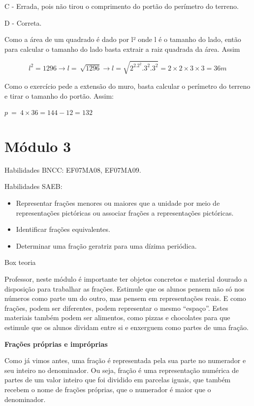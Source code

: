 C - Errada, pois não tirou o comprimento do portão do perímetro do
terreno.

D - Correta.

Como a área de um quadrado é dado por l² onde l é o tamanho do lado,
então para calcular o tamanho do lado basta extrair a raiz quadrada da
área. Assim

\[l^{2} = 1296 \rightarrow l = \ \sqrt{1296} \rightarrow l = \sqrt{2^2.2^{2}.3^{2}.3^{2}} = 2 \times 2 \times 3 \times 3 = 36m\ \]

Como o exercício pede a extensão do muro, basta calcular o perímetro do
terreno e tirar o tamanho do portão. Assim:

\(p\  = \ 4 \times 36 = 144 - 12 = 132\)

\section{Módulo 3}

Habilidades BNCC: EF07MA08, EF07MA09.

Habilidades SAEB:

\begin{itemize}
\item
  Representar frações menores ou maiores que a unidade por meio de
  representações pictóricas ou associar frações a representações
  pictóricas.
\item
  Identificar frações equivalentes.
\item
  Determinar uma fração geratriz para uma dízima periódica.
\end{itemize}

Box teoria

Professor, neste módulo é importante ter objetos concretos e material
dourado a disposição para trabalhar as frações. Estimule que os alunos
pensem não só nos números como parte um do outro, mas pensem em
representações reais. E como frações, podem ser diferentes, podem
representar o mesmo ``espaço''. Estes materiais também podem ser
alimentos, como pizzas e chocolates para que estimule que os alunos
dividam entre si e enxerguem como partes de uma fração.

\textbf{Frações próprias e impróprias}

Como já vimos antes, uma fração é representada pela sua parte no
numerador e seu inteiro no denominador. Ou seja, fração é uma
representação numérica de partes de um valor inteiro que foi dividido em
parcelas iguais, que também recebem o nome de frações próprias, que o
numerador é maior que o denominador.


